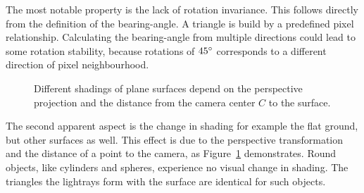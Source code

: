 The most notable property is the lack of rotation invariance.
This follows directly from the definition of the \gls{bearing-angle}.
A triangle is build by a predefined pixel relationship.
Calculating the \gls{bearing-angle} from multiple directions could lead to some rotation stability, because rotations of $45\degree$ corresponds to a different direction of pixel neighbourhood.
\begin{figure}[H]
    \centering
    \caption[Two Bearing-Angles for the same ground plane]{Different shadings of plane surfaces depend on the perspective projection and the distance from the camera center $C$ to the surface.}\label{fig:bearing_angle_shading}
\end{figure}
The second apparent aspect is the change in shading for example the flat ground, but other surfaces as well.
This effect is due to the perspective transformation and the distance of a point to the camera, as Figure~\ref{fig:bearing_angle_shading} demonstrates.
Round objects, like cylinders and spheres, experience no visual change in shading.
The triangles the lightrays form with the surface are identical for such objects.
